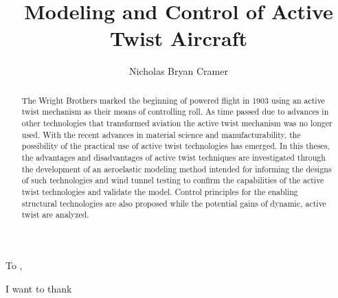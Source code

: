 \documentclass[11pt]{ucthesis}
\begin{document}

\title{Modeling and Control of Active Twist Aircraft}
\author{Nicholas Bryan Cramer}
\deanlinethree{}

\begin{frontmatter}

\maketitle
\copyrightpage

\tableofcontents
\listoffigures
\listoftables

\begin{abstract}
The Wright Brothers marked the beginning of powered flight in 1903 using an active twist mechanism as their means of controlling roll. As time passed due to advances in other technologies that transformed aviation the active twist mechanism was no longer used. With the recent advances in material science and manufacturability, the possibility of the practical use of active twist technologies has emerged. In this theses, the advantages and disadvantages of active twist techniques are investigated through the development of an aeroelastic modeling method intended for informing the designs of such technologies and wind tunnel testing to confirm the capabilities of the active twist technologies and validate the model. Control principles for the enabling structural technologies are also proposed while the potential gains of dynamic, active twist are analyzed.

\end{abstract}

\begin{dedication}
\null\vfil
{\large
\begin{center}
To ,\\\vspace{12pt}

\end{center}}
\vfil\null
\end{dedication}


\begin{acknowledgements}
I want to thank
\end{acknowledgements}

\end{frontmatter}
\end{document}
